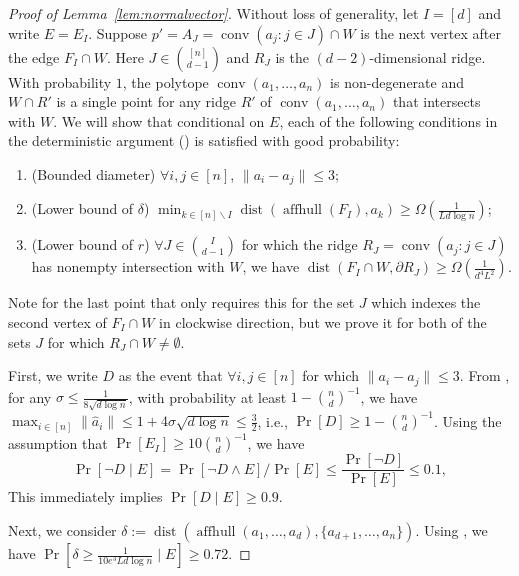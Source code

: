 \documentclass{theoretics}
\newcommand{\aff}{\operatorname{affhull}}
\newcommand{\conv}{\operatorname{conv}}
\newcommand{\dist}{\operatorname{dist}}
\begin{document}
\begin{proof}[Proof of Lemma~\ref{lem:normalvector}]
    Without loss of generality, let $I = [d]$ and write $E = E_I$.
    Suppose $p' = A_J = \conv(a_j : j \in J) \cap W$ is the next vertex after the edge $F_I \cap W$.
    Here $J \in \binom{[n]}{d-1}$ and $R_J$ is the $(d-2)$-dimensional ridge.
    With probability $1$, the polytope $\conv(a_1,\dots,a_n)$
    is non-degenerate and $W \cap R'$ is a single point for any ridge $R'$ of $\conv(a_1,\dots,a_n)$ that intersects with $W$.
    We will show that conditional on $E$, each of the following conditions in the deterministic argument () is satisfied with good probability:
    \begin{enumerate}
        \item (Bounded diameter) $\forall i,j\in [n]$, $\|a_i - a_j\| \leq 3$;
        \item (Lower bound of $\delta$) $\min_{k \in [n] \backslash I}\dist(\aff(F_I), a_k) \geq \Omega(\frac{1}{Ld\log n})$;
        \item (Lower bound of $r$) $\forall J \in \binom{I}{d-1}$ for which the ridge
        $R_J = \conv(a_j : j\in J)$ has nonempty intersection with $W$,
        we have $\dist(F_I \cap W, \partial R_J) \geq  \Omega(\frac{1}{d^4L^2})$.
    \end{enumerate}
    Note for the last point that  only requires this for the set $J$
    which indexes the second vertex of $F_I \cap W$ in clockwise direction,
    but we prove it for both of the sets $J$ for which $R_J \cap W \neq \emptyset$.

    First, we write $D$ as the event that $\forall i, j \in [n]$ for which $\|a_i - a_j\| \leq 3$.
    From , for any $\sigma \leq \frac{1}{8\sqrt{d \log n}}$, with probability at least $1 - \binom{n}{d}^{-1}$, we have $\max_{i \in [n]}\|\hat{a}_i\| \leq 1 + 4\sigma \sqrt{d \log n} \leq \frac{3}{2}$, i.e., $\Pr[D] \geq 1 - \binom{n}{d}^{-1}$.
    Using the assumption that $\Pr[E_I] \geq 10\binom{n}{d}^{-1}$, we have
    $$\Pr[\neg D \mid E] = \Pr[\neg D \wedge E]/\Pr[E] \leq \frac{\Pr[\neg D]}{\Pr[E]} \leq 0.1, $$
    This immediately implies $\Pr[D \mid E] \geq 0.9$.

    Next, we consider $\delta := \dist(\aff(a_1,\dots,a_d), \{a_{d+1},\dots,a_n\})$.
    Using , we have $\Pr[\delta \geq \frac{1}{10e^3 Ld\log n} \mid E] \geq 0.72$.


\end{proof}
\end{document}
